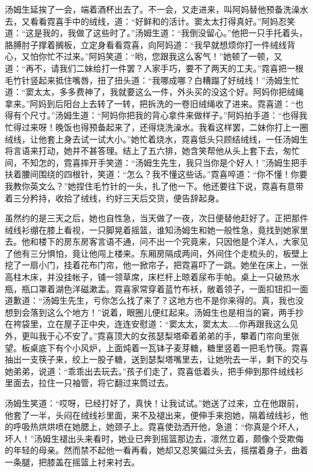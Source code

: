 \par 汤姆生延挨了一会，端着酒杯出去了。不一会，又走进来，叫阿妈替他预备洗澡水去，又看看霓喜手中的绒线，道：“好鲜和的活计。窦太太打得真好。”阿妈忍笑道：“这是我的，我做了这些时了。”汤姆生道：“我倒没留心。”他把一只手托着头，胳膊肘子撑着搁板，立定身看看霓喜，向阿妈道：“我早就想烦你打一件绒线背心，又怕你忙不过来。”阿妈笑道：“哟，您跟我这么客气！”她顿了一顿，又道：“再不，请我们二妹给打一件罢？人家手巧，要不了两天的工夫。”霓喜把一根毛竹针竖起来抵住嘴唇，扭了扭头道：“我哪成哪？白糟蹋了好绒线！”汤姆生忙道：“窦太太，多多费神了，我就要这么一件，外头买的没这个好。阿妈你把绒绳拿来。”阿妈到后阳台上去转了一转，把拆洗的一卷旧绒绳收了进来。霓喜道：“也得有个尺寸。”汤姆生道：“阿妈你把我的背心拿件来做样子。”阿妈拍手道：“也得我忙得过来呀！晚饭也得预备起来了，还得烧洗澡水。我看这样罢，二妹你打上一圈绒线，让他套上身去试一试大小。”她忙着烧水，霓喜低头只顾结绒线，一任汤姆生将言语来打动，她并不甚答理。结上了五六排，她含笑帮他从头上套下去，匆忙间，不知怎的，霓喜摔开手笑道：“汤姆生先生，我只当你是个好人！”汤姆生把手扶着腰间围绕的四根针，笑道：“怎么？我不懂这些话。”霓喜啐道：“你不懂！你要我教你英文么？”她捏住毛竹针的一头，扎了他一下。他还要往下说，霓喜有意带着三分矜持，收拾了绒线，约好三天后交货，便告辞起身。
\par 虽然约的是三天之后，她也自性急，当天做了一夜，次日便替他赶好了。正把那件绒线衫绷在膝上看视，一只脚晃着摇篮，谁知汤姆生和她一般性急，竟找到她家里去。他和楼下的房东房客言语不通，问不出一个究竟来，只因他是个洋人，大家见了他有三分惧怕，竟让他闯上楼来。东厢房隔成两间，外间住个走梳头的，板壁上挖了一扇小门，挂着花布门帘，他一掀帘子，把霓喜吓了一跳。她坐在床上，一张高柱木床，并没挂帐子，铺一领草席，床栏杆上晾着尿布手帕。桌上一只破热水瓶，瓶口罩着湖色洋磁漱盂。霓喜家常穿着蓝竹布袄，敞着领子，一面扣钮扣一面道歉道：“汤姆生先生，亏你怎么找了来了？这地方也不是你来得的。真，我也没想到会落到这么个地方！”说着，眼圈儿便红起来。汤姆生也是相当的窘，两手抄在袴袋里，立在屋子正中央，连连安慰道：“窦太太，窦太太……你再跟我这么见外，更叫我于心不安了。”霓喜顶大的女孩瑟梨塔牵着弟弟的手，攀着门帘向里张望。板桌底下有个小风炉，上面炖着一瓦钵子麦芽糖，糖里竖着一把毛竹筷。霓喜抽出一支筷子来，绞上一股子糖，送到瑟梨塔嘴里去，让她吮去一半，剩下的交与她弟弟，说道：“乖乖出去玩去。”孩子们走了，霓喜低着头，把手伸到那件绒线衫里面去，拉住一只袖管，将它翻过来筒过去。
\par 汤姆生笑道：“哎呀，已经打好了，真快！让我试试。”她送了过来，立在他跟前，他套了一半，头闷在绒线衫里面，来不及褪出来，便伸手来抱她，隔着绒线衫，他的呼吸热烘烘喷在她腮上，她颈子上。霓喜使劲洒开他，急道：“你真是个坏人，坏人！”汤姆生褪出头来看时，她业已奔到摇篮那边去，凛然立着，颇像个受欺侮的年轻的母亲。然而禁不起他一看再看，她却又忍笑偏过头去，摇摆着身子，曲着一条腿，把膝盖在摇篮上衬来衬去。
